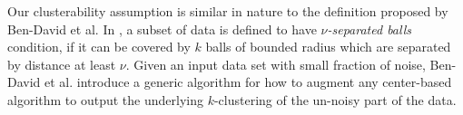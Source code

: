 \documentclass[twoside]{article}
\newcommand{\mc}{\mathcal}
\newtheorem{definition}[theorem]{Definition}
\begin{document}
Our clusterability assumption is similar in nature to the definition proposed by Ben-David et al. In \cite{ben2014clustering}, a subset of data is defined to have \emph{$\nu$-separated balls} condition, if it can be covered by $k$ balls of bounded radius which are separated by distance at least $\nu$. Given an input data set with small fraction of noise, Ben-David et al. introduce a generic algorithm for how to augment any center-based algorithm to output the underlying $k$-clustering of the un-noisy part of the data.



%

\end{document}
